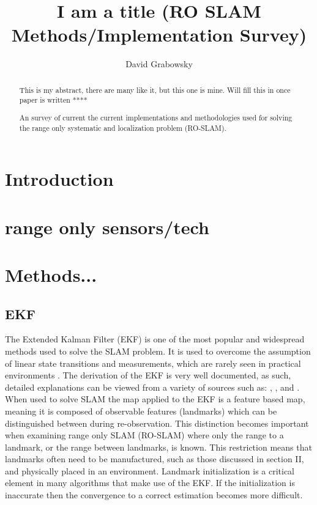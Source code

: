 \documentclass[conference]{IEEEtran}
\begin{document}
	\title{I am a title (RO SLAM Methods/Implementation Survey) }

	\author{David Grabowsky}
	
	
	
	
	\maketitle
	
	
\begin{abstract}

	
	This is my abstract, there are many like it, but this one is mine. Will fill this in once paper is written ****
	
	An survey of current the current implementations and methodologies used for solving the range only systematic and localization problem (RO-SLAM). 

\end{abstract}
	
	
	
\section{Introduction} 

\section{range only sensors/tech}
\section{Methods...}
\subsection{EKF}
The Extended Kalman Filter (EKF) is one of the most popular and widespread methods used to solve the SLAM problem. It is used to overcome the assumption of linear state transitions and measurements, which are rarely seen in practical environments \cite{Thrun2002}. The derivation of the EKF is very well documented, as such, detailed explanations can be viewed from a variety of sources such as: \cite{Thrun2002}, \cite{Ribeiro2004}, and \cite{Haykin2001}. When used to solve SLAM the map applied to the EKF is a feature based map, meaning it is composed of observable features (landmarks) which can be distinguished between during re-observation.\cite{Thrun2002} This distinction becomes important when examining range only SLAM (RO-SLAM) where only the range to a landmark, or the range between landmarks, is known. This restriction means that landmarks often need to be manufactured, such as those discussed in section II, and physically placed in an environment. Landmark initialization is a critical element in many algorithms that make use of the EKF. If the initialization is inaccurate then the convergence to a correct estimation becomes more difficult. 
\end{document}

